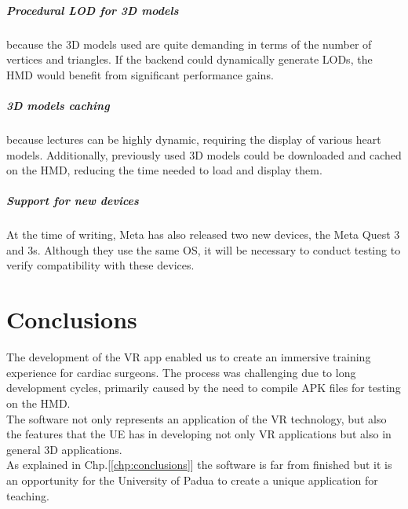 \paragraph{Procedural \ac{LOD} for 3D models}
because the 3D models used are quite demanding in terms of the number of vertices and triangles. If the backend could dynamically generate \ac{LOD}s, the \ac{HMD} would benefit from significant performance gains.

\paragraph{3D models caching}
because lectures can be highly dynamic, requiring the display of various heart models. Additionally, previously used 3D models could be downloaded and cached on the \ac{HMD}, reducing the time needed to load and display them.

\paragraph{Support for new devices}
At the time of writing, Meta has also released two new devices, the Meta Quest 3 and 3s. Although they use the same \ac{OS}, it will be necessary to conduct testing to verify compatibility with these devices.


\chapter{Conclusions}
\noindent
The development of the \ac{VR} app enabled us to create an immersive training experience for cardiac surgeons.
The process was challenging due to long development cycles, primarily caused by the need to compile \ac{APK} files for testing on the \ac{HMD}.\\
The software not only represents an application of the \ac{VR} technology, but also the features  that the \ac{UE} has in developing not only \ac{VR} applications but also in general 3D applications.\\
As explained in Chp.[\ref{chp:conclusions}] the software is far from finished but it is an opportunity for the University of Padua to create a unique application for teaching.\\